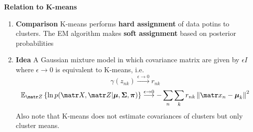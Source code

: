 \documentclass[11pt]{article}
\begin{document}
\begin{defn*}
    \textbf{Relation to K-means} \\
    \begin{enumerate}
        \item \textbf{Comparison} K-means performs \textbf{hard assignment} of data potins to clusters. The EM algorithm makes \textbf{soft assignment} based on posterior probabilities
        \item \textbf{Idea} A Gaussian mixture model in which covariance matrix are given by $\epsilon I$ where $\epsilon \rightarrow 0$ is equivalent to K-means, i.e. 
        \[
            \gamma(z_{nk}) \overset{\epsilon \rightarrow 0}{\longrightarrow} r_{nk}
        \]
        \[
            \E[\bZ]{\ln p(\bX, \bZ | \bmu, \bSigma, \bpi)} \overset{\epsilon\rightarrow 0}{\longrightarrow}
            - \sum_n \sum_k r_{nk} \norm{\bx_n - \bmu_k}^2
        \]
        Also note that K-means does not estimate covariances of clusters but only cluster means. 
    \end{enumerate}
\end{defn*}
\end{document}

